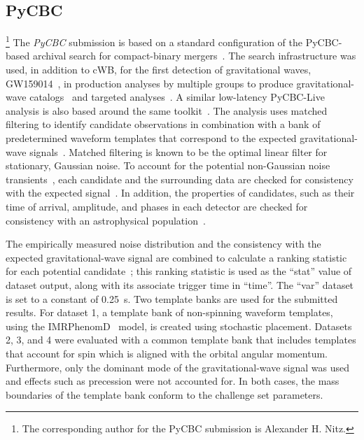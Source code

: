 \subsection{PyCBC}\label{sec:submission-pycbc}
\footnote{The corresponding author for the PyCBC submission is Alexander H. Nitz.}
The \textit{PyCBC} submission is based on a standard
configuration of the PyCBC-based archival search 
for compact-binary mergers~\cite{Nitz:2021zwj}. The search infrastructure was used, in addition to cWB, for the first detection of gravitational waves, GW159014~\cite{LIGOScientific:2016aoc}, in production analyses by multiple groups to produce gravitational-wave catalogs~\cite{LIGOScientific:2021djp, Nitz:2021zwj} and targeted analyses~\cite{Nitz:2019spj}. A similar low-latency PyCBC-Live analysis is also based around the same toolkit~\cite{Nitz:2018rgo,DalCanton:2020vpm}. The analysis uses matched filtering to identify candidate observations in combination with a bank of predetermined waveform templates that correspond to the expected gravitational-wave signals~\cite{Allen:2005fk}. Matched filtering is known to be the optimal linear filter for stationary, Gaussian noise. To account for the potential non-Gaussian noise transients~\cite{Nuttall:2015dqa,Cabero:2019orq,Davis:2022dnd}, each candidate and the surrounding data are checked for consistency with the expected signal~\cite{Allen:2004gu,Nitz:2017lco}. In addition, the properties of candidates, such as their time of arrival, amplitude, and phases in each detector are checked for consistency with an astrophysical population~\cite{Nitz:2017svb}. 

The empirically measured noise distribution and the consistency with the expected gravitational-wave signal are combined to calculate a ranking statistic for each potential candidate~\cite{Nitz:2017svb, Davies:2020tsx}; this ranking statistic is used as the ``stat'' value of dataset output, along with its associate trigger time in ``time''. The ``var'' dataset is set to a constant of \SI{0.25}{\second}. Two template banks
are used for the submitted results. For dataset 1, a template bank of non-spinning
waveform templates, using the IMRPhenomD~\cite{Husa:2015iqa} model, is created using stochastic placement. Datasets 2, 3, and 4 were evaluated with a common template bank that includes templates that account for spin which is aligned with the orbital angular momentum. Furthermore, only the dominant mode of the gravitational-wave signal was used and effects such as precession were not accounted for. In both cases, the mass boundaries of the template bank conform to the challenge set parameters.

